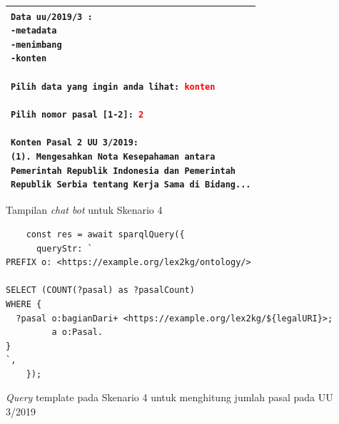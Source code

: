 \begin{listing}[H]
  \begin{center}
    \begin{tabular}{|p{}|}
      \hline
      \makecell[l]{
        \texttt{Data uu/2019/3 :}                                          \\
        \texttt{-metadata}                                                 \\
        \texttt{-menimbang}                                                \\
        \texttt{-konten}                                                   \\
        \\
        \texttt{Pilih data yang ingin anda lihat: \textcolor{red}{konten}} \\
        \\
        \texttt{Pilih nomor pasal [1-2]: \textcolor{red}{2}}               \\
        \\
        \texttt{Konten Pasal 2 UU 3/2019:}                                 \\
        \texttt{(1). Mengesahkan Nota Kesepahaman antara }                 \\
        \texttt{Pemerintah Republik Indonesia dan Pemerintah}              \\
        \texttt{Republik Serbia tentang Kerja Sama di Bidang...}           \\
      }                                                                    \\
      \hline
    \end{tabular}
  \end{center}
  \caption{Tampilan \textit{chat bot} untuk Skenario 4}
  \label{lst:chatbot-4}
\end{listing}

\begin{listing}[H]
  \begin{verbatim}
    const res = await sparqlQuery({
      queryStr: `
PREFIX o: <https://example.org/lex2kg/ontology/>

SELECT (COUNT(?pasal) as ?pasalCount)
WHERE {
  ?pasal o:bagianDari+ <https://example.org/lex2kg/${legalURI}>;
         a o:Pasal.
}
`,
    });
  \end{verbatim}
  \caption{\textit{Query} template pada Skenario 4 untuk menghitung jumlah pasal pada UU 3/2019}
  \label{lst:chatbot-4-1-query}
\end{listing}

